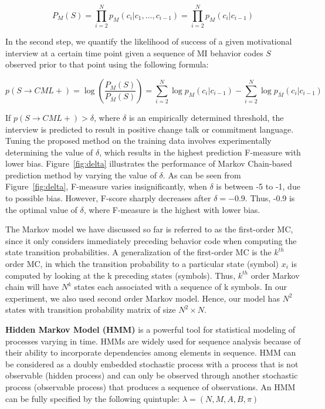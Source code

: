 \documentclass{amia_summit_2018}
\begin{document}
\begin{equation}
P_M(S) = \prod_{i=2}^N p_M(c_i|c_1,\dots,c_{i-1})=\prod_{i=2}^N p_M(c_i|c_{i-1})
\end{equation}

In the second step, we quantify the likelihood of success of a given motivational interview at a certain time point given a sequence of MI behavior codes $S$ observed prior to that point using the following formula:

\begin{equation}
p(S\rightarrow CML+) = \log\left(\frac{P_M(S)}{P_{\overline M}(S)}\right)= \sum_{i=2}^N \log p_M(c_i|c_{i-1})-\sum_{i=2}^N \log p_{\overline M}(c_i|c_{i-1})\label{eq:class}
\end{equation}

If $p(S\rightarrow CML+) > \delta $, where $\delta$ is an empirically determined threshold, the interview is predicted to result in positive change talk or commitment language. Tuning the proposed method on the training data involves experimentally determining the value of $\delta$, which results in the highest prediction F-measure with lower bias. Figure~\ref{fig:delta} illustrates the performance of Markov Chain-based prediction method by varying the value of $\delta$. As can be seen from Figure~\ref{fig:delta}, F-measure varies insignificantly, when $\delta $ is between -5 to -1, due to possible bias. However, F-score sharply decreases after $\delta = -0.9$. Thus, -0.9 is the optimal value of $\delta $, where F-measure is the highest with lower bias. 


The Markov model we have discussed so far is referred to as the first-order MC, since it only considers immediately preceding behavior code when computing the state transition probabilities. A generalization of the first-order MC is the $k^{th}$ order MC, in which the transition probability to a particular state (symbol) $x_i$ is computed by looking at the k preceding states (symbols). Thus, $k^{th}$ order Markov chain will have $N^{k}$ states each associated with a sequence of k symbols. In our experiment, we also used second order Markov model. Hence, our model has $N^2$ states with transition probability matrix of size $N^2 \times N$.  

\textbf {Hidden Markov Model (HMM)} is a powerful tool for statistical modeling of processes varying in time. HMMs are widely used for sequence analysis because of their ability to incorporate dependencies among elements in sequence. HMM can be considered as a doubly embedded stochastic process with a process that is not observable (hidden process) and can only be observed through another stochastic process (observable process) that produces a sequence of observations. An HMM can be fully specified by the following quintuple: $\lambda = (N, M, A, B, \pi)$
\end{document}
